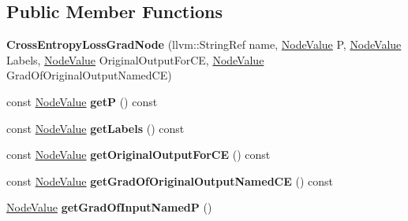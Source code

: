\subsection*{Public Member Functions}
\begin{DoxyCompactItemize}
\item 
\mbox{\label{classglow_1_1_cross_entropy_loss_grad_node_a0068bb6d8da041301292369300214263}} 
{\bfseries Cross\+Entropy\+Loss\+Grad\+Node} (llvm\+::\+String\+Ref name, \hyperlink{structglow_1_1_node_value}{Node\+Value} P, \hyperlink{structglow_1_1_node_value}{Node\+Value} Labels, \hyperlink{structglow_1_1_node_value}{Node\+Value} Original\+Output\+For\+CE, \hyperlink{structglow_1_1_node_value}{Node\+Value} Grad\+Of\+Original\+Output\+Named\+CE)
\item 
\mbox{\label{classglow_1_1_cross_entropy_loss_grad_node_a92a9dab28bb17cab2cd4b0e1dbadd2f8}} 
const \hyperlink{structglow_1_1_node_value}{Node\+Value} {\bfseries getP} () const
\item 
\mbox{\label{classglow_1_1_cross_entropy_loss_grad_node_abef19509390b857f9190b9e4a1b959ea}} 
const \hyperlink{structglow_1_1_node_value}{Node\+Value} {\bfseries get\+Labels} () const
\item 
\mbox{\label{classglow_1_1_cross_entropy_loss_grad_node_aa4f58cca7aab98a047c26b239addef19}} 
const \hyperlink{structglow_1_1_node_value}{Node\+Value} {\bfseries get\+Original\+Output\+For\+CE} () const
\item 
\mbox{\label{classglow_1_1_cross_entropy_loss_grad_node_aadecd28780021d44b28485a1ca93608f}} 
const \hyperlink{structglow_1_1_node_value}{Node\+Value} {\bfseries get\+Grad\+Of\+Original\+Output\+Named\+CE} () const
\item 
\mbox{\label{classglow_1_1_cross_entropy_loss_grad_node_a8ac6393608e34be3d84a7f010adfcc17}} 
\hyperlink{structglow_1_1_node_value}{Node\+Value} {\bfseries get\+Grad\+Of\+Input\+NamedP} ()
\item 
\mbox{\label{classglow_1_1_cross_entropy_loss_grad_node_a5100cc023e9522a8f4f79fc4e7f6997b}} 

\end{DoxyCompactItemize}
